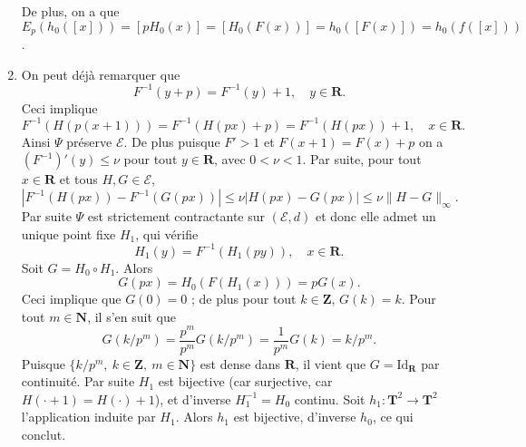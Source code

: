 \documentclass[a4paper,12pt,openany]{article}
\theoremstyle{plain}
\theoremstyle{definition}
\newcommand{\T}{\mathbf{T}}
\newcommand{\R}{\mathbf{R}}
\newcommand{\Z}{\mathbf{Z}}
\newcommand{\N}{\mathbf{N}}
\begin{document}
\begin{enumerate}
De plus, on a que $E_p(h_0([x])) = [p H_0(x)] = [H_0(F(x))] = h_0([F(x)]) = h_0(f([x]))$. 

\item On peut d\'ej\`a remarquer que 
$$
F^{-1}(y + p) = F^{-1}(y) + 1, \quad y \in \R.
$$
Ceci implique 
$$
F^{-1}(H(p(x+1))) = F^{-1}(H(px) + p) = F^{-1}(H(px)) + 1, \quad x \in \R.
$$
Ainsi $\Psi$ pr\'eserve $\mathcal{E}$.
De plus puisque $F' > 1$ et $F(x+1) = F(x) + p$ on a  $(F^{-1})'(y) \leq \nu$ pour tout $y\in \R$, avec $0 <\nu < 1$. Par suite, pour tout $x \in \R$ et tous $H,G \in \mathcal{E}$,
$$
|F^{-1}(H(px)) - F^{-1}(G(px))| \leq \nu |H(px) - G(px)| \leq \nu \|H-G\|_{\infty}.
$$
Par suite $\Psi$ est strictement contractante sur $(\mathcal{E},d)$ et donc elle admet un unique point fixe $H_1$, qui v\'erifie
$$
H_1(y) = F^{-1}(H_1(py)), \quad x \in \R.
$$
Soit $G = H_0 \circ H_1.$ Alors
$$
G(px) = H_0(F(H_1(x))) = p G(x).
$$
Ceci implique que $G(0) = 0$ ; de plus pour tout $k \in \Z$, $G(k) = k$. Pour tout $m \in \N$, il s'en suit que
$$
G(k/p^m) = \frac{p^m}{p^m}G(k/p^m) = \frac{1}{p^m}G(k) = k/p^m.
$$
Puisque $\{k/p^m,~k \in \Z,~m \in \N\}$ est dense dans $\R$, il vient que $G = \mathrm{Id}_\R$ par continuit\'e. Par suite $H_1$ est bijective (car surjective, car $H(\cdot + 1) = H(\cdot) + 1$), et d'inverse $H_1^{-1} = H_0$ continu. Soit $h_1 : \T^2 \to \T^2$ l'application induite par $H_1$. Alors $h_1$ est bijective, d'inverse $h_0$, ce qui conclut.
\end{enumerate}
\end{document}
